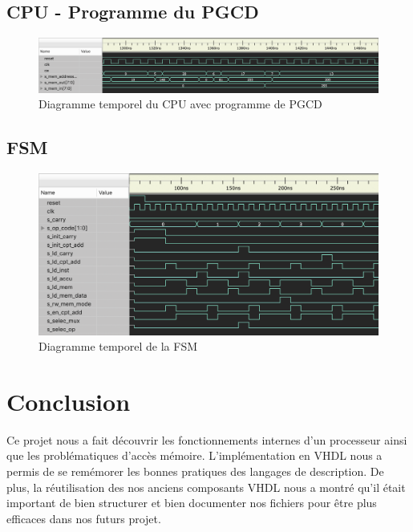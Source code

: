 \documentclass{article}
\begin{document}
    \newpage
    
    \subsection{CPU - Programme du PGCD}
    \begin{figure}[h]
        \centering
        \includegraphics[width=\textwidth]{../doc/tb_screen/cpu_2nd_prog.png}
        \caption{Diagramme temporel du CPU avec programme de PGCD}
        \label{fig:diag_tb_cpu_2nd_prog}
    \end{figure}

    \subsection{FSM}
    \begin{figure}[h]
        \centering
        \includegraphics[width=\textwidth]{../doc/tb_screen/fsm.png}
        \caption{Diagramme temporel de la FSM}
        \label{fig:diag_tb_fsm}
    \end{figure}

    \newpage

    \section{Conclusion}
    \par Ce projet nous a fait découvrir les fonctionnements internes d'un processeur ainsi que les problématiques d'accès mémoire. L'implémentation en VHDL nous a permis de se remémorer les bonnes pratiques des langages de description. De plus, la réutilisation des nos anciens composants VHDL nous a montré qu'il était important de bien structurer et bien documenter nos fichiers pour être plus efficaces dans nos futurs projet.

\end{document}
